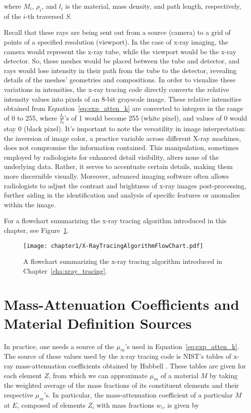 \noindent where $M_i$, $\rho_i$, and $l_i$ is the material, mass density, and path length, respectively, of the $i$-th traversed $S$.

\par Recall that these rays are being sent out from a source (camera) to a grid of points of a specified resolution (viewport). In the case of x-ray imaging, the camera would represent the x-ray tube, while the viewport would be the x-ray detector. So, these meshes would be placed between the tube and detector, and rays would lose intensity in their path from the tube to the detector, revealing details of the meshes' geometries and compositions. In order to visualize these variations in intensities, the x-ray tracing code directly converts the relative intensity values into pixels of an 8-bit grayscale image. These relative intensities obtained from Equation~\ref{eq:exp_atten_k} are converted to integers in the range of 0 to 255, where $\frac{I_k}{I_0}$'s of 1 would become 255 (white pixel), and values of 0 would stay 0 (black pixel). It's important to note the versatility in image interpretation: the inversion of image color, a practice variable across different X-ray machines, does not compromise the information contained. This manipulation, sometimes employed by radiologists for enhanced detail visibility, alters none of the underlying data. Rather, it serves to accentuate certain details, making them more discernible visually. Moreover, advanced imaging software often allows radiologists to adjust the contrast and brightness of x-ray images post-processing, further aiding in the identification and analysis of specific features or anomalies within the image.


\par For a flowchart summarizing the x-ray tracing algorithm introduced in this chapter, see Figure~\ref{fig:xray_trace_flowchart}.

\begin{figure}[htb!]
  \centering
  \texttt{[image: chapter1/X-RayTracingAlgorithmFlowChart.pdf]}
  \caption{A flowchart summarizing the x-ray tracing algorithm introduced in Chapter~\ref{cha:xray_tracing}.}
  \label{fig:xray_trace_flowchart}
\end{figure}

\section{Mass-Attenuation Coefficients and Material Definition Sources}
In practice, one needs a source of the $\mu_m$'s used in Equation~\ref{eq:exp_atten_k}. The source of these values used by the x-ray tracing code is NIST's tables of x-ray mass-attenuation coefficients obtained by Hubbell \cite{hubbell1982photon}. These tables are given for each element $Z$, from which we can approximate $\mu_m$ of a material $M$ by taking the weighted average of the mass fractions of its constituent elements and their respective $\mu_m$'s. In particular, the mass-attenuation coefficient of a particular $M$ at $E$, composed of elements ${Z_i}$ with mass fractions ${w_i}$, is given by

